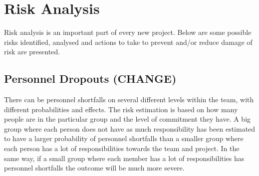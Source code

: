 \documentclass[a4paper]{article}
\begin{document}
\section{Risk Analysis}

Risk analysis is an important part of every new project. Below are some possible risks identified, analysed and actions to take to prevent and/or reduce damage of risk are presented.  

\subsection{Personnel Dropouts (CHANGE)}
There can be personnel shortfalls on several different levels within the team, with different probabilities and effects. The risk estimation is based on how many people are in the particular group and the level of commitment they have. A big group where each person does not have as much responsibility has been estimated to have a larger probability of personnel shortfalls than a smaller group where each person has a lot of responsibilities towards the team and project. In the same way, if a small group where each member has a lot of responsibilities has personnel shortfalls the outcome will be much more severe.
\end{document}
